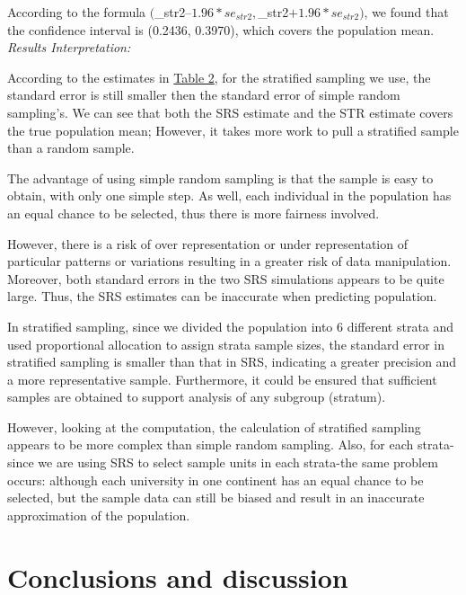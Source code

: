 \documentclass{article}
\begin{document}
According to the formula $($_{str2}$ – 1.96*se_{str2},  $_{str2}$ + 1.96*se_{str2})$, we found that the confidence interval is (0.2436, 0.3970), which covers the population mean. \\

\noindent\textit{Results Interpretation:}

According to the estimates in {\hyperref[tab:(b)]{Table 2}}, for the stratified sampling we use, the standard error is still smaller then the standard error of simple random sampling's. We can see that both the SRS estimate and the STR estimate covers the true population mean; However, it takes more work to pull a stratified sample than a random sample. \\


The advantage of using simple random sampling is that the sample is easy to obtain, with only one simple step. As well, each individual in the population has an equal chance to be selected, thus there is more fairness involved. 

However, there is a risk of over representation or under representation of particular patterns or variations resulting in a greater risk of data manipulation. Moreover, both standard errors in the two SRS simulations appears to be quite large. Thus, the SRS estimates can be inaccurate when predicting population. 

In stratified sampling, since we divided the population into 6 different strata and used proportional allocation to assign strata sample sizes, the standard error in stratified sampling is smaller than that in SRS, indicating a greater precision and a more representative sample. Furthermore, it could be ensured that sufficient samples are obtained to support analysis of any subgroup (stratum).

However, looking at the computation, the calculation of stratified sampling appears to be more complex than simple random sampling. Also, for each strata-since we are using SRS to select sample units in each strata-the same problem occurs: although each university in one continent has an equal chance to be selected, but the sample data can still be biased and result in an inaccurate approximation of the population.



\section{Conclusions and discussion}
\end{document}
